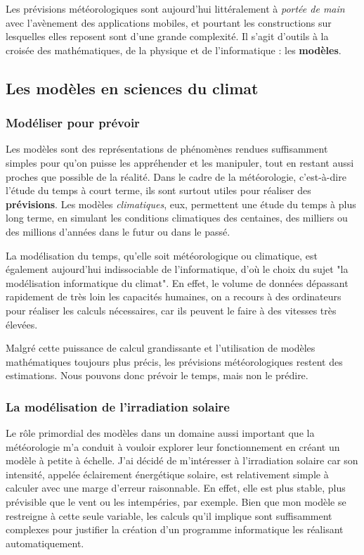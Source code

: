 \documentclass[12pt]{article}
\begin{document}
Les prévisions météorologiques sont aujourd'hui littéralement à \emph{portée de main} avec l'avènement des applications mobiles, et pourtant les constructions sur lesquelles elles reposent sont d'une grande complexité.
Il s'agit d'outils à la croisée des mathématiques, de la physique et de l'informatique : les \textbf{modèles}.

\subsection{Les modèles en sciences du climat}

\subsubsection{Modéliser pour prévoir}
Les modèles sont des représentations de phénomènes rendues suffisamment simples pour qu'on puisse les appréhender et les manipuler, tout en restant aussi proches que possible de la réalité.
Dans le cadre de la météorologie, c'est-à-dire l'étude du temps à court terme, ils sont surtout utiles pour réaliser des \textbf{prévisions}.
Les modèles \emph{climatiques}, eux, permettent une étude du temps à plus long terme, en simulant les conditions climatiques des centaines, des milliers ou des millions d'années dans le futur ou dans le passé.

La modélisation du temps, qu'elle soit météorologique ou climatique, est également aujourd'hui indissociable de l'informatique, d'où le choix du sujet "la modélisation informatique du climat".
En effet, le volume de données dépassant rapidement de très loin les capacités humaines, on a recours à des ordinateurs pour réaliser les calculs nécessaires, car ils peuvent le faire à des vitesses très élevées.

Malgré cette puissance de calcul grandissante et l'utilisation de modèles mathématiques toujours plus précis, les prévisions météorologiques restent des estimations.
Nous pouvons donc prévoir le temps, mais non le prédire.


\subsubsection{La modélisation de l'irradiation solaire}

Le rôle primordial des modèles dans un domaine aussi important que la météorologie m'a conduit à vouloir explorer leur fonctionnement en créant un modèle à petite à échelle.
J'ai décidé de m'intéresser à l'irradiation solaire car son intensité, appelée éclairement énergétique solaire, est relativement simple à calculer avec une marge d'erreur raisonnable.
En effet, elle est plus stable, plus prévisible que le vent ou les intempéries, par exemple.
Bien que mon modèle se restreigne à cette seule variable, les calculs qu'il implique sont suffisamment complexes pour justifier la création d'un programme informatique les réalisant automatiquement.
\end{document}
